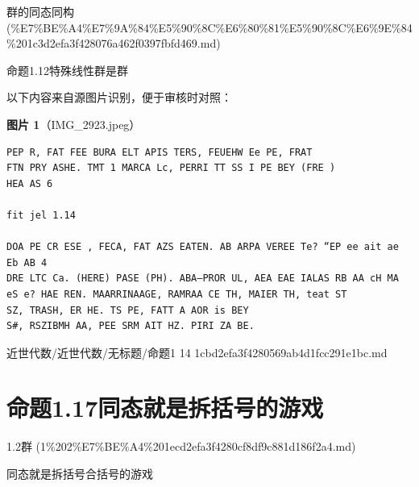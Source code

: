 \begin{note}[来源上级主题]

群的同态同构 (\%E7\%BE\%A4\%E7\%9A\%84\%E5\%90\%8C\%E6\%80\%81\%E5\%90\%8C\%E6\%9E\%84\%201c3d2efa3f428076a462f0397fbfd469.md)

\end{note}

\begin{proposition}[命题1.14]

命题1.12特殊线性群是群

\end{proposition}

\begin{note}
以下内容来自源图片识别，便于审核时对照：

\textbf{图片 1}（IMG\_2923.jpeg）
\begin{Verbatim}[fontsize=\small]
PEP R, FAT FEE BURA ELT APIS TERS, FEUEHW Ee PE, FRAT
FTN PRY ASHE. TMT 1 MARCA Lc, PERRI TT SS I PE BEY (FRE )
HEA AS 6

fit jel 1.14

DOA PE CR ESE , FECA, FAT AZS EATEN. AB ARPA VEREE Te? “EP ee ait ae Eb AB 4
DRE LTC Ca. (HERE) PASE (PH). ABA—PROR UL, AEA EAE IALAS RB AA cH MA
eS e? HAE REN. MAARRINAAGE, RAMRAA CE TH, MAIER TH, teat ST
SZ, TRASH, ER HE. TS PE, FATT A AOR is BEY
S#, RSZIBMH AA, PEE SRM AIT HZ. PIRI ZA BE.
\end{Verbatim}

\end{note}

\begin{note}[来源路径]

近世代数/近世代数/无标题/命题1 14 1cbd2efa3f4280569ab4d1fcc291e1bc.md

\end{note}

\section*{命题1.17同态就是拆括号的游戏}

\begin{note}[来源上级主题]

1.2群 (1\%202\%E7\%BE\%A4\%201ecd2efa3f4280cf8df9c881d186f2a4.md)

\end{note}

\begin{proposition}[命题1.17同态就是拆括号的游戏]

同态就是拆括号合括号的游戏

\end{proposition}

